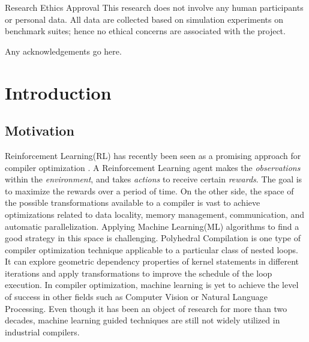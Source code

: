 \documentclass[logo,msc]{infthesis}           %
\begin{document}
\begin{preliminary}
\maketitle

\newenvironment{ethics}
   {\begin{frontenv}{Research Ethics Approval}{\LARGE}}
   {\end{frontenv}\newpage}

\begin{ethics}
This research does not involve any human participants or personal data. All data are collected based on simulation experiments on benchmark suites; hence no ethical concerns are associated with the project.

\standarddeclaration
\end{ethics}


\begin{acknowledgements}
Any acknowledgements go here.
\end{acknowledgements}


\tableofcontents
\end{preliminary}


\chapter{Introduction}

\section{Motivation}

Reinforcement Learning(RL) has recently been seen as a promising approach for compiler optimization \cite{8357388}\cite{9232934}. A Reinforcement Learning agent makes the \textit{observations} within the \textit{environment}, and takes \textit{actions} to receive certain \textit{rewards}. The goal is to maximize the rewards over a period of time. On the other side, the space of the possible transformations available to a compiler is vast to achieve optimizations related to data locality, memory management, communication, and automatic parallelization. Applying Machine Learning(ML) algorithms to find a good strategy in this space is challenging. Polyhedral Compilation is one type of compiler optimization technique applicable to a particular class of nested loops. It can explore geometric dependency properties of kernel statements in different iterations and apply transformations to improve the schedule of the loop execution. In compiler optimization, machine learning is yet to achieve the level of success in other fields such as Computer Vision or Natural Language Processing. Even though it has been an object of research for more than two decades, machine learning guided techniques are still not widely utilized in industrial compilers.
\end{document}
